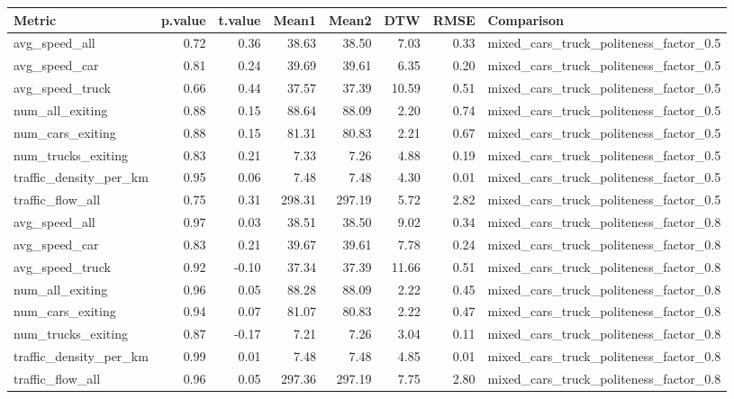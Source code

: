\begin{table}[ht]
\centering
\begin{tabular}{lrrrrrrl}
  \hline
Metric & p.value & t.value & Mean1 & Mean2 & DTW & RMSE & Comparison \\ 
  \hline
avg\_speed\_all & 0.72 & 0.36 & 38.63 & 38.50 & 7.03 & 0.33 & mixed\_cars\_truck\_politeness\_factor\_0.5 \\ 
  avg\_speed\_car & 0.81 & 0.24 & 39.69 & 39.61 & 6.35 & 0.20 & mixed\_cars\_truck\_politeness\_factor\_0.5 \\ 
  avg\_speed\_truck & 0.66 & 0.44 & 37.57 & 37.39 & 10.59 & 0.51 & mixed\_cars\_truck\_politeness\_factor\_0.5 \\ 
  num\_all\_exiting & 0.88 & 0.15 & 88.64 & 88.09 & 2.20 & 0.74 & mixed\_cars\_truck\_politeness\_factor\_0.5 \\ 
  num\_cars\_exiting & 0.88 & 0.15 & 81.31 & 80.83 & 2.21 & 0.67 & mixed\_cars\_truck\_politeness\_factor\_0.5 \\ 
  num\_trucks\_exiting & 0.83 & 0.21 & 7.33 & 7.26 & 4.88 & 0.19 & mixed\_cars\_truck\_politeness\_factor\_0.5 \\ 
  traffic\_density\_per\_km & 0.95 & 0.06 & 7.48 & 7.48 & 4.30 & 0.01 & mixed\_cars\_truck\_politeness\_factor\_0.5 \\ 
  traffic\_flow\_all & 0.75 & 0.31 & 298.31 & 297.19 & 5.72 & 2.82 & mixed\_cars\_truck\_politeness\_factor\_0.5 \\ 
  avg\_speed\_all & 0.97 & 0.03 & 38.51 & 38.50 & 9.02 & 0.34 & mixed\_cars\_truck\_politeness\_factor\_0.8 \\ 
  avg\_speed\_car & 0.83 & 0.21 & 39.67 & 39.61 & 7.78 & 0.24 & mixed\_cars\_truck\_politeness\_factor\_0.8 \\ 
  avg\_speed\_truck & 0.92 & -0.10 & 37.34 & 37.39 & 11.66 & 0.51 & mixed\_cars\_truck\_politeness\_factor\_0.8 \\ 
  num\_all\_exiting & 0.96 & 0.05 & 88.28 & 88.09 & 2.22 & 0.45 & mixed\_cars\_truck\_politeness\_factor\_0.8 \\ 
  num\_cars\_exiting & 0.94 & 0.07 & 81.07 & 80.83 & 2.22 & 0.47 & mixed\_cars\_truck\_politeness\_factor\_0.8 \\ 
  num\_trucks\_exiting & 0.87 & -0.17 & 7.21 & 7.26 & 3.04 & 0.11 & mixed\_cars\_truck\_politeness\_factor\_0.8 \\ 
  traffic\_density\_per\_km & 0.99 & 0.01 & 7.48 & 7.48 & 4.85 & 0.01 & mixed\_cars\_truck\_politeness\_factor\_0.8 \\ 
  traffic\_flow\_all & 0.96 & 0.05 & 297.36 & 297.19 & 7.75 & 2.80 & mixed\_cars\_truck\_politeness\_factor\_0.8 \\ 
   \hline
\end{tabular}
\end{table}
